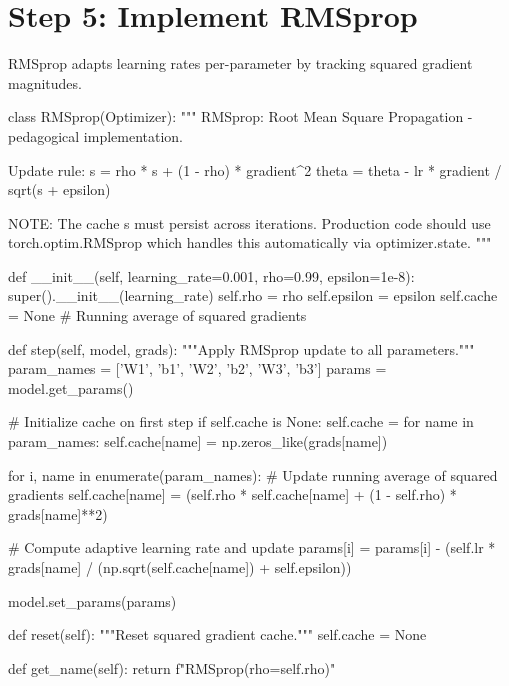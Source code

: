 \documentclass[../../main.tex]{subfiles}
\begin{document}
\section{Step 5: Implement RMSprop}
\label{sec:capstone-rmsprop}

RMSprop adapts learning rates per-parameter by tracking squared gradient magnitudes.

\begin{pythoncode}
class RMSprop(Optimizer):
    """
    RMSprop: Root Mean Square Propagation - pedagogical implementation.

    Update rule:
        s = rho * s + (1 - rho) * gradient^2
        theta = theta - lr * gradient / sqrt(s + epsilon)

    NOTE: The cache s must persist across iterations.
    Production code should use torch.optim.RMSprop which handles
    this automatically via optimizer.state.
    """

    def __init__(self, learning_rate=0.001, rho=0.99, epsilon=1e-8):
        super().__init__(learning_rate)
        self.rho = rho
        self.epsilon = epsilon
        self.cache = None  # Running average of squared gradients

    def step(self, model, grads):
        """Apply RMSprop update to all parameters."""
        param_names = ['W1', 'b1', 'W2', 'b2', 'W3', 'b3']
        params = model.get_params()

        # Initialize cache on first step
        if self.cache is None:
            self.cache = {}
            for name in param_names:
                self.cache[name] = np.zeros_like(grads[name])

        for i, name in enumerate(param_names):
            # Update running average of squared gradients
            self.cache[name] = (self.rho * self.cache[name] +
                               (1 - self.rho) * grads[name]**2)

            # Compute adaptive learning rate and update
            params[i] = params[i] - (self.lr * grads[name] /
                                     (np.sqrt(self.cache[name]) + self.epsilon))

        model.set_params(params)

    def reset(self):
        """Reset squared gradient cache."""
        self.cache = None

    def get_name(self):
        return f"RMSprop(rho={self.rho})"
\end{pythoncode}
\end{document}
